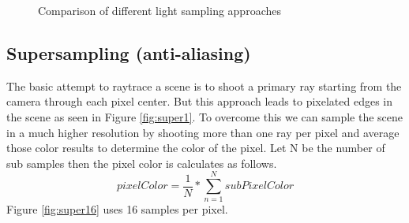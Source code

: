 \documentclass[sigconf, nonacm]{acmart}
\begin{document}
\begin{figure}[ht]
{    %
  }
  \caption{Comparison of different light sampling approaches}
  \label{fig:lightSampling}
  \end{figure}


\subsection{Supersampling (anti-aliasing)}
The basic attempt to raytrace a scene is to shoot a primary ray starting from the camera through each pixel center. But this approach leads to 
pixelated edges in the scene as seen in Figure \ref{fig:super1}. 
To overcome this we can sample the scene in a much higher resolution by shooting more than one ray per pixel
and average those color results to determine the color of the pixel. Let N be the number of sub samples then the pixel color is calculates as follows.
\[pixelColor = \frac{1}{N}*\sum_{n=1}^{N}subPixelColor\] 
Figure \ref{fig:super16} uses 16 samples per pixel.
\end{document}
